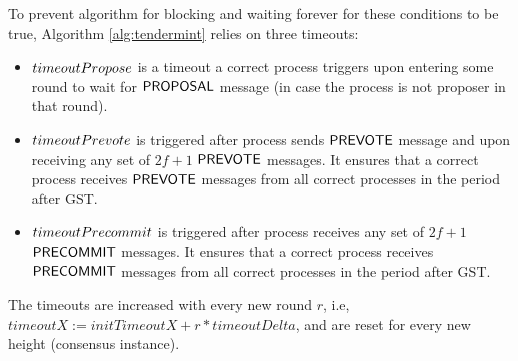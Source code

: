 To prevent algorithm for blocking and waiting forever for these conditions to be true, Algorithm \ref{alg:tendermint} relies on three timeouts: 
\begin{itemize}
	\item $timeoutPropose$ is a timeout a correct process triggers upon entering some round to wait for $\mathsf{PROPOSAL}$ message (in case the process is not proposer in that round).
	\item $timeoutPrevote$ is triggered after process sends $\mathsf{PREVOTE}$ message and upon receiving any set of $2f+1$ $\mathsf{PREVOTE}$ messages. It ensures that a correct process receives $\mathsf{PREVOTE}$ messages from all correct processes in the period after GST. 
	\item $timeoutPrecommit$ is triggered after process receives any set of $2f+1$ $\mathsf{PRECOMMIT}$ messages. It ensures that a correct process receives $\mathsf{PRECOMMIT}$ messages from all correct processes in the period after GST. 
\end{itemize}

The timeouts are increased with every new round $r$, i.e, $timeoutX := initTimeoutX + r*timeoutDelta$, and are reset for every new height (consensus instance).
 

